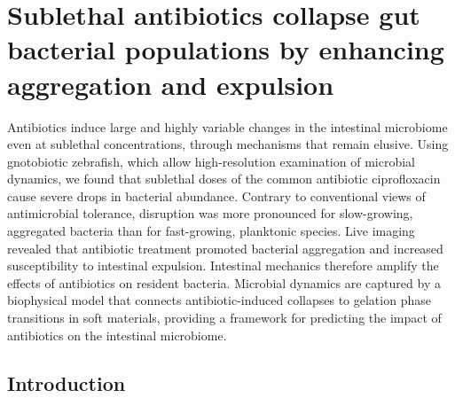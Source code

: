 
\def\reals{\mathbb{R}}
\def\be{\begin{equation}}
\def\ee{\end{equation}}
\def\bea{\begin{eqnarray}}
\def\eea{\end{eqnarray}}
\def\bml{\begin{mathletters}}
\def\eml{\end{mathletters}}
\def\bse{\begin{subequations}}
\def\ese{\end{subequations}}
\def\expec{\mathbb{E}}
\def\exp{\text{exp}}
\def\Var{\text{Var}}
\def\e{\text{e}}
\def\ba{\begin{align}}
\def\ea{\end{align}}

\chapter{Sublethal antibiotics collapse gut bacterial populations by enhancing aggregation and expulsion}


Antibiotics induce large and highly variable changes in the intestinal microbiome even at sublethal concentrations, through mechanisms that remain elusive. Using gnotobiotic zebrafish, which allow high-resolution examination of microbial dynamics, we found that sublethal doses of the common antibiotic ciprofloxacin cause severe drops in bacterial abundance. Contrary to conventional views of antimicrobial tolerance, disruption was more pronounced for slow-growing, aggregated bacteria than for fast-growing, planktonic species. Live imaging revealed that antibiotic treatment promoted bacterial aggregation and increased susceptibility to intestinal expulsion. Intestinal mechanics therefore amplify the effects of antibiotics on resident bacteria. Microbial dynamics are captured by a biophysical model that connects antibiotic-induced collapses to gelation phase transitions in soft materials, providing a framework for predicting the impact of antibiotics on the intestinal microbiome.












\section*{Introduction}


